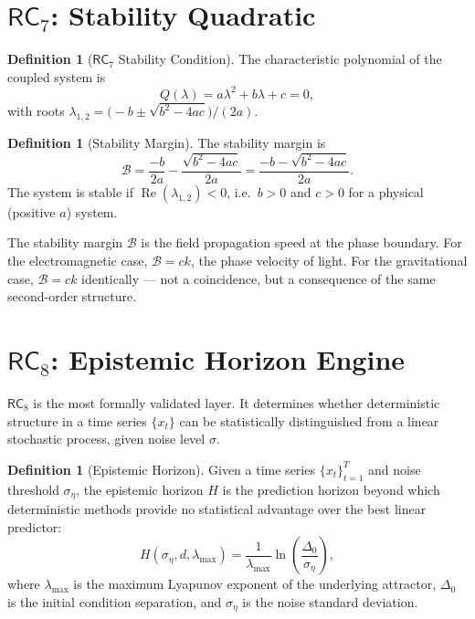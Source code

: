\documentclass[11pt,twoside]{article}
\theoremstyle{plain}
\theoremstyle{definition}
\newtheorem{definition}[theorem]{Definition}
\theoremstyle{remark}
\newcommand{\RC}[1]{\textsf{RC}_{#1}}
\begin{document}
\section{\texorpdfstring{$\RC{7}$}{RC7}: Stability Quadratic}

\begin{definition}[$\RC{7}$ Stability Condition]
The characteristic polynomial of the coupled system is
\begin{equation}\label{eq:quad}
  Q(\lambda) = a\lambda^2 + b\lambda + c = 0,
\end{equation}
with roots $\lambda_{1,2} = \bigl(-b \pm \sqrt{b^2-4ac}\bigr)/(2a)$.
\end{definition}

\begin{definition}[Stability Margin]
The stability margin is
\begin{equation}
  \mathcal{B} = \frac{-b}{2a} - \frac{\sqrt{b^2-4ac}}{2a}
              = \frac{-b - \sqrt{b^2-4ac}}{2a}.
\end{equation}
The system is stable if $\operatorname{Re}(\lambda_{1,2})<0$, i.e.\ $b>0$ and
$c>0$ for a physical (positive $a$) system.
\end{definition}

The stability margin $\mathcal{B}$ is the field propagation speed at the phase
boundary.  For the electromagnetic case, $\mathcal{B}=ck$, the phase velocity
of light.  For the gravitational case, $\mathcal{B}=ck$ identically --- not a
coincidence, but a consequence of the same second-order structure.

\section{\texorpdfstring{$\RC{8}$}{RC8}: Epistemic Horizon Engine}

$\RC{8}$ is the most formally validated layer.  It determines whether
deterministic structure in a time series $\{x_t\}$ can be statistically
distinguished from a linear stochastic process, given noise level $\sigma$.

\begin{definition}[Epistemic Horizon]\label{def:rc8}
Given a time series $\{x_t\}_{t=1}^T$ and noise threshold $\sigma_\eta$,
the epistemic horizon $H$ is the prediction horizon beyond which deterministic
methods provide no statistical advantage over the best linear predictor:
\begin{equation}
  H(\sigma_\eta,d,\lambda_{\max}) = \frac{1}{\lambda_{\max}}
  \ln\!\left(\frac{\Delta_0}{\sigma_\eta}\right),
\end{equation}
where $\lambda_{\max}$ is the maximum Lyapunov exponent of the underlying
attractor, $\Delta_0$ is the initial condition separation, and $\sigma_\eta$
is the noise standard deviation.
\end{definition}
\end{document}
